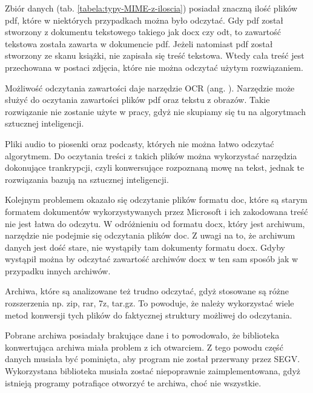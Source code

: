 Zbiór danych (tab. \ref{tabela:typy-MIME-z-iloscia}) posiadał znaczną ilość plików pdf, które w niektórych przypadkach
można było odczytać. Gdy pdf został stworzony z dokumentu tekstowego takiego
jak docx czy odt, to zawartość tekstowa została zawarta w dokumencie pdf. Jeżeli
natomiast pdf został stworzony ze skanu książki, nie zapisała się treść tekstowa.
Wtedy cała treść jest przechowana w postaci zdjęcia, które nie można odczytać użytym
rozwiązaniem.

Możliwość odczytania zawartości daje narzędzie OCR (ang. ).
Narzędzie może służyć do oczytania zawartości plików pdf oraz tekstu z obrazów.
Takie rozwiązanie nie zostanie użyte w pracy, gdyż nie skupiamy się tu na 
algorytmach sztucznej inteligencji.

Pliki audio to piosenki oraz podcasty, których nie można łatwo odczytać algorytmem.
Do oczytania treści z takich plików można wykorzystać narzędzia dokonujące 
trankrypcji, czyli konwersujące rozpoznaną mowę na tekst, jednak te rozwiązania bazują 
na sztucznej inteligencji.

Kolejnym problemem okazało się odczytanie plików formatu doc, które są starym 
formatem dokumentów wykorzystywanych przez Microsoft i ich zakodowana treść nie
jest łatwa do odczytu. W odróżnieniu od formatu docx, który jest archiwum, 
narzędzie nie podejmie się odczytania plików doc. Z uwagi na to, że archiwum danych
jest dość stare, nie wystąpiły tam dokumenty formatu docx. Gdyby wystąpił można
by odczytać zawartość archiwów docx w ten sam sposób jak w przypadku innych 
archiwów.

Archiwa, które są analizowane też trudno odczytać, gdyż stosowane są różne 
rozszerzenia np. zip, rar, 7z, tar.gz. To powoduje, że należy wykorzystać wiele
metod konwersji tych plików do faktycznej struktury możliwej do odczytania.

Pobrane archiwa posiadały brakujące dane i to powodowało, że biblioteka konwertująca
archiwa miała problem z ich otwarciem. Z tego powodu część danych musiała być 
pominięta, aby program nie został przerwany przez SEGV. Wykorzystana biblioteka
musiała zostać niepoprawnie zaimplementowana, gdyż istnieją programy potrafiące
otworzyć te archiwa, choć nie wszystkie. 

